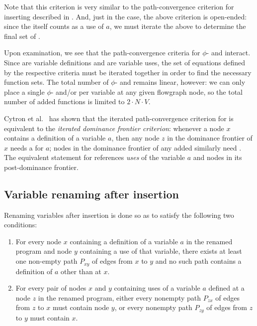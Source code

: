 Note that this criterion is very similar to the path-con\-ver\-gence
criterion for inserting  described in
\cite{appel:modern,cytron91:ssa}.  And, just in the \phifunction{}
case, the above criterion is open-ended: since the \sigfunction{}
itself counts as a use of $a$, we must iterate the above to determine
the final set of .

Upon examination, we see that the path-con\-ver\-gence criteria for $\phi$- and
 interact.  Since  are variable
definitions and  are variable uses, the set of
equations defined by the respective criteria must be iterated together 
in order to find the necessary function sets.  The total number of
$\phi$- and  remains linear, however: we can only place 
a single $\phi$- and/or \sigfunction{} per variable at any given
flowgraph node, so the total number of added functions is limited to 
$2 \cdot N \cdot V$.

Cytron et al.\ \cite{cytron91:ssa} has shown that the iterated
path-con\-ver\-gence criterion for  is equivalent to the
\textit{iterated dominance frontier criterion}: whenever a node $x$
contains a definition of a variable $a$, then any node $z$ in the
dominance frontier of $x$ needs a \phifunction{} for $a$; nodes in the
dominance frontier of any added \phifunction{} similarly need
.  The equivalent statement for 
references \textit{uses} of the variable $a$ and nodes in its
post-dominance frontier. 

\subsection{Variable renaming after \phisigfunction insertion}

Renaming variables after \phisigfunction insertion is done so as to
satisfy the following two conditions:
\begin{enumerate}
\item For every node $x$ containing a definition of a variable $a$ in
the renamed program and node $y$ containing a use of that variable, there
exists at least one non-empty path $P_{xy}$ of edges from $x$ to $y$
and no such path contains a definition of $a$ other than at $x$.
\item For every pair of nodes $x$ and $y$ containing uses of a
variable $a$ defined at a node $z$ in the renamed program, either
every nonempty path $P_{zx}$ of edges from $z$ to $x$ must contain
node $y$, or every nonempty path $P_{zy}$ of edges from $z$ to $y$
must contain $x$.
\end{enumerate}

